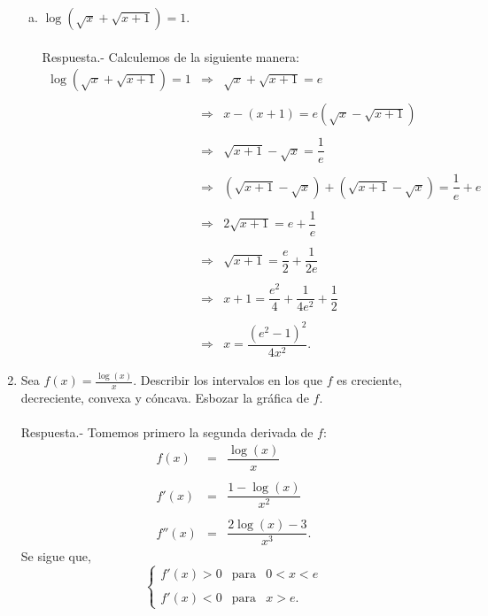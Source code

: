 \begin{enumerate}[\bfseries 1.]
\begin{enumerate}[(a)]
	    \item $\log\left(\sqrt{x}+\sqrt{x+1}\right)=1$.\\\\
		Respuesta.-\; Calculemos de la siguiente manera:
		$$
		\begin{array}{rcl}
		    \log\left(\sqrt{x}+\sqrt{x+1}\right)=1 &\Rightarrow& \sqrt{x}+\sqrt{x+1}=e\\\\
							   &\Rightarrow& x-(x+1)=e\left(\sqrt{x}-\sqrt{x+1}\right)\\\\
							   &\Rightarrow& \sqrt{x+1}-\sqrt{x}=\dfrac{1}{e}\\\\
							   &\Rightarrow& \left(\sqrt{x+1}-\sqrt{x}\right)+\left(\sqrt{x+1}-\sqrt{x}\right)=\dfrac{1}{e}+e\\\\
							   &\Rightarrow& 2\sqrt{x+1}=e+\dfrac{1}{e}\\\\
							   &\Rightarrow& \sqrt{x+1}=\dfrac{e}{2}+\dfrac{1}{2e}\\\\
							   &\Rightarrow& x+1=\dfrac{e^2}{4}+\dfrac{1}{4e^2}+\dfrac{1}{2}\\\\
							   &\Rightarrow& x=\dfrac{\left(e^2-1\right)^2}{4x^2}.
		\end{array}
		$$
		\vspace{.5cm}

	\end{enumerate}

    \item Sea $f(x)=\frac{\log(x)}{x}$. Describir los intervalos en los que $f$ es creciente, decreciente, convexa y cóncava. Esbozar la gráfica de $f$.\\\\
	Respuesta.-\; Tomemos primero la segunda derivada de $f$:
	$$
	\begin{array}{rcl}
	    f(x) &=& \dfrac{\log(x)}{x}\\\\
	    f'(x) &=& \dfrac{1-\log(x)}{x^2}\\\\
	    f''(x) &=& \dfrac{2\log(x)-3}{x^3}.
	\end{array}
	$$
	Se sigue que,
	$$
	\left\{
	\begin{array}{rcl}
	    f'(x)>0 &\mbox{para} & 0<x<e\\\\
	    f'(x)<0 &\mbox{para} & x>e.
	\end{array}
	\right.
	$$


\end{enumerate}
